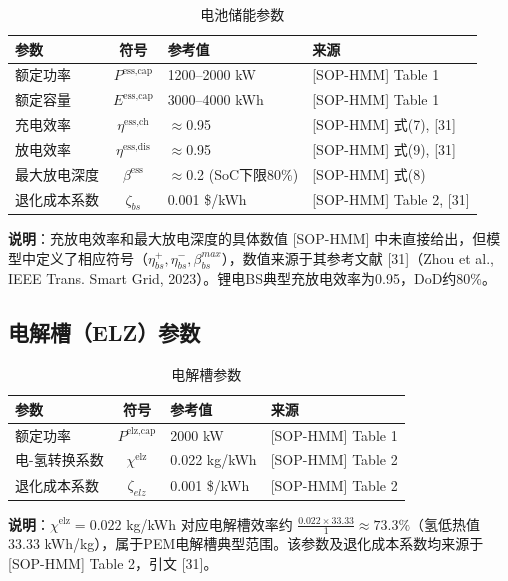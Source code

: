 \documentclass[11pt]{ctexart}
\begin{document}
\begin{table}[htbp]
\centering
\caption{电池储能参数}
\begin{tabular}{lcll}
\hline
参数 & 符号 & 参考值 & 来源 \\
\hline
额定功率 & $P^{\text{ess,cap}}$ & 1200--2000 kW & {[SOP-HMM]} Table 1 \\
额定容量 & $E^{\text{ess,cap}}$ & 3000--4000 kWh & {[SOP-HMM]} Table 1 \\
充电效率 & $\eta^{\text{ess,ch}}$ & $\approx$0.95 & {[SOP-HMM]} 式(7), {[31]} \\
放电效率 & $\eta^{\text{ess,dis}}$ & $\approx$0.95 & {[SOP-HMM]} 式(9), {[31]} \\
最大放电深度 & $\beta^{\text{ess}}$ & $\approx$0.2 (SoC下限80\%) & {[SOP-HMM]} 式(8) \\
退化成本系数 & $\zeta_{bs}$ & 0.001 \$/kWh & {[SOP-HMM]} Table 2, {[31]} \\
\hline
\end{tabular}
\end{table}

\textbf{说明}：充放电效率和最大放电深度的具体数值 {[SOP-HMM]} 中未直接给出，但模型中定义了相应符号（$\eta^{+}_{bs}, \eta^{-}_{bs}, \beta^{max}_{bs}$），数值来源于其参考文献 {[31]}（Zhou et al., IEEE Trans. Smart Grid, 2023）。锂电BS典型充放电效率为0.95，DoD约80\%。

\subsection{电解槽（ELZ）参数}

\begin{table}[htbp]
\centering
\caption{电解槽参数}
\begin{tabular}{lcll}
\hline
参数 & 符号 & 参考值 & 来源 \\
\hline
额定功率 & $P^{\text{elz,cap}}$ & 2000 kW & {[SOP-HMM]} Table 1 \\
电-氢转换系数 & $\chi^{\text{elz}}$ & 0.022 kg/kWh & {[SOP-HMM]} Table 2 \\
退化成本系数 & $\zeta_{elz}$ & 0.001 \$/kWh & {[SOP-HMM]} Table 2 \\
\hline
\end{tabular}
\end{table}

\textbf{说明}：$\chi^{\text{elz}}=0.022$ kg/kWh 对应电解槽效率约 $\frac{0.022 \times 33.33}{1} \approx 73.3\%$（氢低热值 33.33 kWh/kg），属于PEM电解槽典型范围。该参数及退化成本系数均来源于 {[SOP-HMM]} Table 2，引文 {[31]}。
\end{document}
